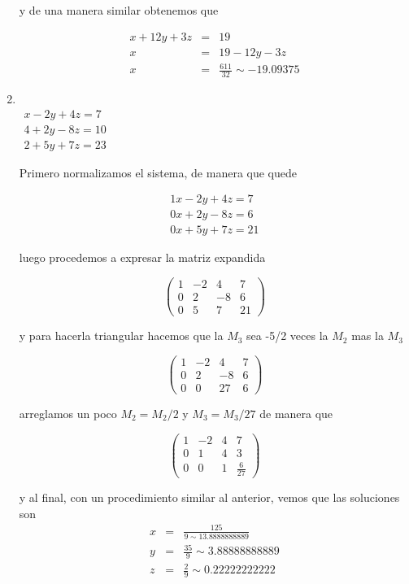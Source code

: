 \documentclass[11pt]{article}
\begin{document}
\begin{multicols}{2}
\begin{enumerate}[\bf{Sistema} 1]
			y de una manera similar obtenemos que 
			
			\begin{eqnarray*}
				x + 12y + 3z &=& 19 \\
				x &=& 19 - 12y - 3z \\
				x &=& \frac{611}{32} \sim -19.09375
			\end{eqnarray*}
			
			
			
		\item
			\ \\ $\begin{matrix}
				x - 2y + 4z =  7 \\
				4 + 2y - 8z = 10 \\
				2 + 5y + 7z = 23
			\end{matrix}$
			
			\par Primero normalizamos el sistema, de manera que quede
			
			$$\begin{matrix}
				1x - 2y + 4z =  7 \\
				0x + 2y - 8z =  6 \\
				0x + 5y + 7z = 21
			\end{matrix}$$
			
			luego procedemos a expresar la matriz expandida
			
			$$\left(\begin{array}{rrrr}
				1 & -2 & 4 & 7 \\
				0 & 2 & -8 & 6 \\
				0 & 5 & 7 & 21
			\end{array}\right)$$
			
			y para hacerla triangular hacemos que la $M_3$ sea -5/2 veces la $M_2$ mas la $M_3$
			
			$$\left(\begin{array}{rrrr}
				1 & -2 & 4 & 7 \\
				0 & 2 & -8 & 6 \\
				0 & 0 & 27 & 6
			\end{array}\right)$$
			
			arreglamos un poco $M_2 = M_2/2$ y $M_3 = M_3/27$ de manera que
			
			$$\left(\begin{array}{rrrr}
				1 & -2 & 4 & 7 \\
				0 & 1 & 4 & 3 \\
				0 & 0 & 1 & \frac{6}{27}
			\end{array}\right)$$
			
			 y al final, con un procedimiento similar al anterior, vemos que las soluciones son
			 \begin{eqnarray*}
			 	x &=& \frac{125}{9 \sim 13.8888888889}\\
			 	y &=& \frac{35}{9} \sim 3.88888888889\\
			 	z &=& \frac{2}{9} \sim 0.22222222222
			 \end{eqnarray*}
			
	\end{enumerate}
\end{multicols}
\end{document}
